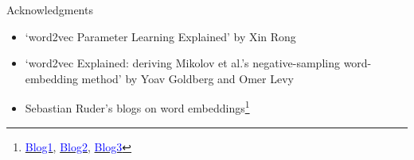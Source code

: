 \begin{frame}
	\begin{block}{Acknowledgments}
		\begin{itemize}\justifying
			\item  `word2vec Parameter Learning Explained' by Xin Rong
			\item  `word2vec Explained: deriving Mikolov et al.'s negative-sampling word-embedding method' by Yoav Goldberg and Omer Levy
			\item Sebastian Ruder's blogs on word embeddings\footnote{\href{http://ruder.io/word-embeddings-1/}{\textcolor{blue}{Blog1}}, \href{http://ruder.io/word-embeddings-softmax/index.html}{\textcolor{blue}{Blog2}}, \href{http://ruder.io/secret-word2vec/index.html}{\textcolor{blue}{Blog3}}}
		\end{itemize}
	\end{block}
\end{frame}
